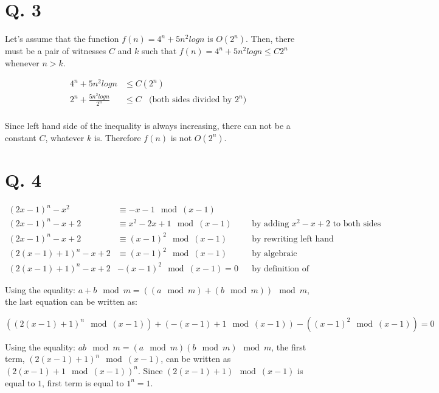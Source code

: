 \documentclass[11pt]{article}
\begin{document}
	\section*{Q. 3}
	Let's assume that the function $f(n)=4^n + 5n^2logn$ is $O(2^n)$. Then, there must be a pair of witnesses $C$ and $k$ such that $f(n)=4^n + 5n^2logn \leq C2^n$ whenever $n > k$.
	
	\begin{center}
		\begin{align*}
			4^n + 5n^2logn &\leq C(2^n)\\
			2^n + \frac{5n^2logn}{2^n} &\leq C \ \ \ \ \text{(both sides divided by $2^n$)}\\
		\end{align*}
	\end{center}
	
	Since left hand side of the inequality is always increasing, there can not be a constant $C$, whatever $k$ is. Therefore $f(n)$ is not $O(2^n)$.
	
	\section*{Q. 4}
	\begin{center}
		\begin{align*}
			(2x-1)^n - x^2 &\equiv -x-1 \mod (x-1)\\
			(2x-1)^n - x + 2 &\equiv x^2 - 2x + 1 \mod (x-1) && \text{by adding $x^2-x+2$ to both sides}\\
			(2x-1)^n - x + 2 &\equiv (x-1)^2\mod (x-1) && \text{by rewriting left hand side as a square}\\
			(2(x-1)+1)^n - x + 2 &\equiv (x-1)^2\mod (x-1) && \text{by algebraic manipulations}\\
			(2(x-1)+1)^n - x + 2 &- (x-1)^2\mod (x-1)= 0 && \text{by definition of congruence modulo}
		\end{align*}
	\end{center}
	
	Using the equality: $a + b \mod m = ((a \mod m) + (b \mod m))  \mod m$, the last equation can be written as:
	
	\begin{equation*}
		((2(x-1)+1)^n \mod (x-1)) + (-(x-1) +1 \mod (x-1)) - ((x-1)^2\mod (x-1))=0
	\end{equation*}

	Using the equality: $ab \mod m = (a \mod m)(b \mod m) \mod m$, the first term, $(2(x-1) + 1)^n \mod (x-1)$, can be written as $(2(x-1) + 1 \mod (x-1))^n$.
	Since $(2(x-1) + 1) \mod (x-1)$ is equal to $1$, first term is equal to $1^n = 1$.
	
\end{document}
